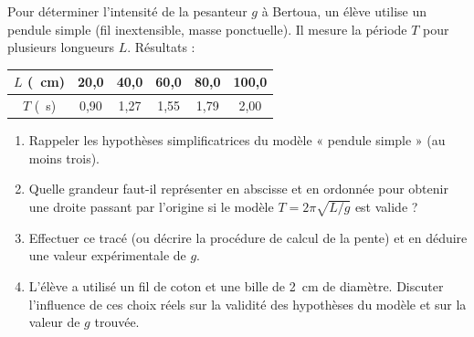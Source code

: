 \documentclass[11pt]{article}
\begin{document}
\begin{exercice}
Pour déterminer l'intensité de la pesanteur $g$ à Bertoua, un élève utilise un pendule simple (fil inextensible, masse ponctuelle). Il mesure la période $T$ pour plusieurs longueurs $L$. Résultats :

\begin{center}
\begin{tabular}{|c|c|c|c|c|c|}
\hline
$L$ (\SI{}{cm}) & 20,0 & 40,0 & 60,0 & 80,0 & 100,0 \\
\hline
$T$ (\SI{}{s}) & 0,90 & 1,27 & 1,55 & 1,79 & 2,00 \\
\hline
\end{tabular}
\end{center}

\begin{enumerate}
    \item Rappeler les hypothèses simplificatrices du modèle « pendule simple » (au moins trois).
    \item Quelle grandeur faut-il représenter en abscisse et en ordonnée pour obtenir une droite passant par l'origine si le modèle $T = 2\pi\sqrt{L/g}$ est valide ?
    \item Effectuer ce tracé (ou décrire la procédure de calcul de la pente) et en déduire une valeur expérimentale de $g$.
    \item L'élève a utilisé un fil de coton et une bille de \SI{2}{cm} de diamètre. Discuter l'influence de ces choix réels sur la validité des hypothèses du modèle et sur la valeur de $g$ trouvée.
\end{enumerate}
\end{exercice}
\end{document}

